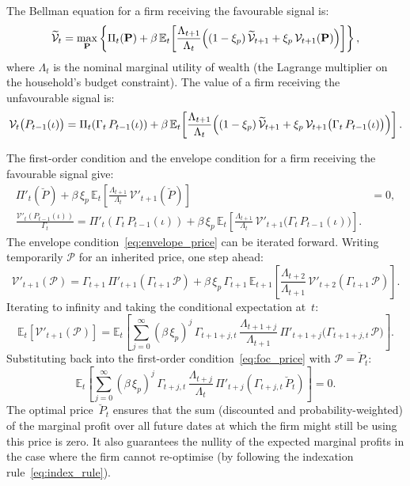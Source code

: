 \documentclass[11pt,a4paper]{article}
\newcommand{\E}{\mathbb{E}}
\begin{document}
The Bellman equation for a firm receiving the favourable signal is:
\begin{equation}\label{eq:bellman_fav}
  \widetilde{\mathcal{V}}_t
  = \max_{\mathbf{P}}\left\{
    \Pi_t(\mathbf{P})
    + \beta\,\E_t\!\left[\frac{\Lambda_{t+1}}{\Lambda_t}
      \Bigl((1-\xi_p)\,\widetilde{\mathcal{V}}_{t+1}
      + \xi_p\,\mathcal{V}_{t+1}(\mathbf{P})\Bigr)\right]
  \right\},
\end{equation}
where $\Lambda_t$ is the nominal marginal utility of wealth (the
Lagrange multiplier on the household's budget constraint). The value of a
firm receiving the unfavourable signal is:
\begin{equation}\label{eq:bellman_unfav}
  \mathcal{V}_t\bigl(P_{t-1}(\iota)\bigr)
  = \Pi_t\!\left(\Gamma_t\,P_{t-1}(\iota)\right)
  + \beta\,\E_t\!\left[\frac{\Lambda_{t+1}}{\Lambda_t}
    \Bigl((1-\xi_p)\,\widetilde{\mathcal{V}}_{t+1}
    + \xi_p\,\mathcal{V}_{t+1}\bigl(\Gamma_t\,P_{t-1}(\iota)\bigr)
    \Bigr)\right].
\end{equation}

The first-order condition and the envelope condition for a firm receiving
the favourable signal give:
\begin{align}
  \Pi'_t(\breve P) + \beta\,\xi_p\,\E_t\!\left[
    \frac{\Lambda_{t+1}}{\Lambda_t}\,\mathcal{V}'_{t+1}(\breve P)\right]
  &= 0, \label{eq:foc_price}\\[4pt]
  \frac{\mathcal{V}'_t(P_{t-1}(\iota))}{\Gamma_t}
  = \Pi'_t\!\left(\Gamma_t\,P_{t-1}(\iota)\right)
  + \beta\,\xi_p\,\E_t\!\left[
    \frac{\Lambda_{t+1}}{\Lambda_t}\,
    \mathcal{V}'_{t+1}\bigl(\Gamma_t\,P_{t-1}(\iota)\bigr)\right].
    \label{eq:envelope_price}
\end{align}
The envelope condition~\eqref{eq:envelope_price} can be iterated forward.
Writing temporarily $\mathcal{P}$ for an inherited price, one step ahead:
\[
  \mathcal{V}'_{t+1}(\mathcal{P})
  = \Gamma_{t+1}\,\Pi'_{t+1}(\Gamma_{t+1}\,\mathcal{P})
  + \beta\,\xi_p\,\Gamma_{t+1}\,
    \E_{t+1}\!\left[\frac{\Lambda_{t+2}}{\Lambda_{t+1}}\,
    \mathcal{V}'_{t+2}(\Gamma_{t+1}\,\mathcal{P})\right].
\]
Iterating to infinity and taking the conditional expectation at~$t$:
\[
  \E_t\!\left[\mathcal{V}'_{t+1}(\mathcal{P})\right]
  = \E_t\!\left[\sum_{j=0}^{\infty}(\beta\,\xi_p)^j\,
    \Gamma_{t+1+j,t}\,\frac{\Lambda_{t+1+j}}{\Lambda_{t+1}}\,
    \Pi'_{t+1+j}\bigl(\Gamma_{t+1+j,t}\,\mathcal{P}\bigr)\right].
\]
Substituting back into the first-order
condition~\eqref{eq:foc_price} with $\mathcal{P} = \breve P_t$:
\begin{equation}\label{eq:optimal_price_sum}
  \E_t\!\left[\sum_{j=0}^{\infty}(\beta\,\xi_p)^j\,
  \Gamma_{t+j,t}\,\frac{\Lambda_{t+j}}{\Lambda_t}\,
  \Pi'_{t+j}\!\left(\Gamma_{t+j,t}\,\breve P_t\right)\right] = 0.
\end{equation}
The optimal price~$\breve P_t$ ensures that the sum (discounted and
probability-weighted) of the marginal profit over all future dates at
which the firm might still be using this price is zero. It also
guarantees the nullity of the expected marginal profits in the case
where the firm cannot re-optimise (by following the indexation
rule~\eqref{eq:index_rule}).
\end{document}
